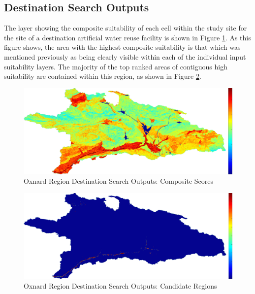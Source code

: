     \subsection{Destination Search Outputs}
    
The layer showing the composite suitability of each cell within the study site for the site of a destination artificial water reuse facility is shown in Figure \ref{fig:Odsoutputs_comp}. As this figure shows, the area with the highest composite suitability is that which was mentioned previously as being clearly visible within each of the individual input suitability layers. The majority of the top ranked areas of contiguous high suitability are contained within this region, as shown in Figure \ref{fig:Odsoutputs_cand}.
    
        \begin{figure}[!h]
            \begin{center}
            \includegraphics[width=5.5in]{figures/Oxnard_Search_Composite.png}   
            \caption{Oxnard Region Destination Search Outputs: Composite Scores}
            \label{fig:Odsoutputs_comp}
            \end{center}
        \end{figure}
        
        \begin{figure}[!h]
            \begin{center}
            \includegraphics[width=5.5in]{figures/Oxnard_Search_Output.png}   
            \caption{Oxnard Region Destination Search Outputs: Candidate Regions}
            \label{fig:Odsoutputs_cand}
            \end{center}
        \end{figure}

